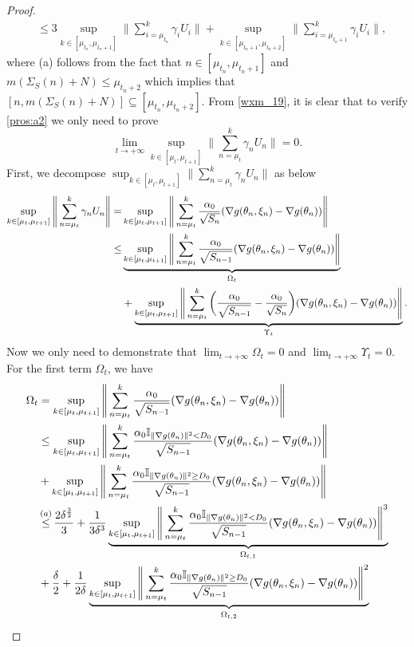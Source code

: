 \documentclass[standalone]{article}
\newcommand{\I}{\mathbb{I}}
\begin{document}
\begin{proof}
\begin{align}
& \leq 3 \sup_{k\in[\mu_{t_{n}}, \mu_{t_{n}+1}]}\Bigg\|\sum_{i=\mu_{t_{n}}}^{k}\gamma_{i}U_{i}\Bigg\|  + \sup_{k\in[\mu_{t_{n}+1}, \mu_{t_{n}+2}]}\Bigg\|\sum_{i=\mu_{t_{n}+1}}^{k}\gamma_{i}U_{i}\Bigg\|,
\end{align}
where (a) follows from the fact that $n \in[\mu_{t_{n}},\mu_{t_{n}+1}]$ and $m(\Sigma_{S}(n) + N) \leq \mu_{t_n+2}$ which implies that \( [n, m(\Sigma_{S}(n) + N)] \subseteq [\mu_{t_{n}}, \mu_{t_{n}+2}] \). From \cref{wxm_19}, it is clear that to verify \cref{pros:a2} we only need to prove $$\lim_{t\rightarrow+\infty}\sup_{k\in[\mu_{t}, \mu_{t+1}]}\big\|\sum_{n=\mu_{t}}^{k}\gamma_{n}U_{n}\big\|=0. $$ First, we decompose $\sup_{k\in[\mu_{t}, \mu_{t+1}]}\big\|\sum_{n=\mu_{t}}^{k}\gamma_{n}U_{n}\big\|$ as below 
\begin{align}\label{wxm_06}
\sup_{k\in[\mu_{t}, \mu_{t+1}]}\Bigg\|\sum_{n=\mu_{t}}^{k}\gamma_{n}U_{n}\Bigg\|=&\sup_{k\in[\mu_{t}, \mu_{t+1}]}\Bigg\|\sum_{n=\mu_{t}}^{k}\frac{\alpha_{0}}{\sqrt{S_{n}}}(\nabla g(\theta_{n},\xi_{n})-\nabla g(\theta_{n}))\Bigg\|\notag\\\le&\underbrace{\sup_{k\in[\mu_{t}, \mu_{t+1}]}\Bigg\|\sum_{n=\mu_{t}}^{k}\frac{\alpha_{0}}{\sqrt{S_{n-1}}}(\nabla g(\theta_{n},\xi_{n})-\nabla g(\theta_{n}))\Bigg\|}_{\Omega_{t}}\notag \\&+\underbrace{\sup_{k\in[\mu_{t}, \mu_{t+1}]}\Bigg\|\sum_{n=\mu_{t}}^{k}\bigg(\frac{\alpha_{0}}{\sqrt{S_{n-1}}}-\frac{\alpha_{0}}{\sqrt{S_{n}}}\bigg)(\nabla g(\theta_{n},\xi_{n})-\nabla g(\theta_{n}))\Bigg\|}_{\Upsilon_{t}}.
\end{align}
Now we only need to demonstrate that \(\lim_{t\rightarrow+\infty}\Omega_{t}=0\) and \(\lim_{t\rightarrow+\infty}\Upsilon_{t}=0\). For the first term $\Omega_{t}$, we have
\begin{align}\label{wxm_05}
\Omega_{t}&=\sup_{k\in[\mu_{t}, \mu_{t+1}]}\Bigg\|\sum_{n=\mu_{t}}^{k}\frac{\alpha_{0}}{\sqrt{S_{n-1}}}(\nabla g(\theta_{n},\xi_{n})-\nabla g(\theta_{n}))\Bigg\|\notag\\&\le\sup_{k\in[\mu_{t}, \mu_{t+1}]}\Bigg\|\sum_{n=\mu_{t}}^{k}\frac{\alpha_{0}\I_{\|\nabla g(\theta_{n})\|^{2}<D_{0}}}{\sqrt{S_{n-1}}}(\nabla g(\theta_{n},\xi_{n})-\nabla g(\theta_{n}))\Bigg\|\notag\\&+\sup_{k\in[\mu_{t}, \mu_{t+1}]}\Bigg\|\sum_{n=\mu_{t}}^{k}\frac{\alpha_{0}\I_{\|\nabla g(\theta_{n})\|^{2}\ge D_{0}}}{\sqrt{S_{n-1}}}(\nabla g(\theta_{n},\xi_{n})-\nabla g(\theta_{n}))\Bigg\| \notag \\&\mathop{\le}^{(a)} \frac{2\delta^{\frac{3}{2}}}{3}+\frac{1}{3\delta^{3}}\underbrace{\sup_{k\in[\mu_{t}, \mu_{t+1}]}\Bigg\|\sum_{n=\mu_{t}}^{k}\frac{\alpha_{0}\I_{\|\nabla g(\theta_{n})\|^{2}<D_{0}}}{\sqrt{S_{n-1}}}(\nabla g(\theta_{n},\xi_{n})-\nabla g(\theta_{n}))\Bigg\|^{3}}_{\Omega_{t,1}}\notag\\&+\frac{\delta}{2}+\frac{1}{2\delta}\underbrace{\sup_{k\in[\mu_{t}, \mu_{t+1}]}\Bigg\|\sum_{n=\mu_{t}}^{k}\frac{\alpha_{0}\I_{\|\nabla g(\theta_{n})\|^{2}\ge D_{0}}}{\sqrt{S_{n-1}}}(\nabla g(\theta_{n},\xi_{n})-\nabla g(\theta_{n}))\Bigg\|^{2}}_{\Omega_{t,2}}

\end{align}
\end{proof}
\end{document}

